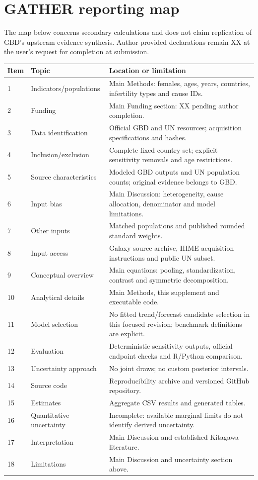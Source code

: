 \documentclass[11pt,a4paper]{article}
\begin{document}
\section{GATHER reporting map}
The map below concerns secondary calculations and does not claim replication of GBD's upstream evidence synthesis. Author-provided declarations remain XX at the user's request for completion at submission.
\small
\begin{longtable}{p{}p{}p{}}
\toprule Item & Topic & Location or limitation\\\midrule\endhead
1 & Indicators/populations & Main Methods: females, ages, years, countries, infertility types and cause IDs.\\
2 & Funding & Main Funding section: XX pending author completion.\\
3 & Data identification & Official GBD and UN resources; acquisition specifications and hashes.\\
4 & Inclusion/exclusion & Complete fixed country set; explicit sensitivity removals and age restrictions.\\
5 & Source characteristics & Modeled GBD outputs and UN population counts; original evidence belongs to GBD.\\
6 & Input bias & Main Discussion: heterogeneity, cause allocation, denominator and model limitations.\\
7 & Other inputs & Matched populations and published rounded standard weights.\\
8 & Input access & Galaxy source archive, IHME acquisition instructions and public UN subset.\\
9 & Conceptual overview & Main equations: pooling, standardization, contrast and symmetric decomposition.\\
10 & Analytical details & Main Methods, this supplement and executable code.\\
11 & Model selection & No fitted trend/forecast candidate selection in this focused revision; benchmark definitions are explicit.\\
12 & Evaluation & Deterministic sensitivity outputs, official endpoint checks and R/Python comparison.\\
13 & Uncertainty approach & No joint draws; no custom posterior intervals.\\
14 & Source code & Reproducibility archive and versioned GitHub repository.\\
15 & Estimates & Aggregate CSV results and generated tables.\\
16 & Quantitative uncertainty & Incomplete: available marginal limits do not identify derived uncertainty.\\
17 & Interpretation & Main Discussion and established Kitagawa literature.\\
18 & Limitations & Main Discussion and uncertainty section above.\\\bottomrule
\end{longtable}\normalsize
\end{document}
